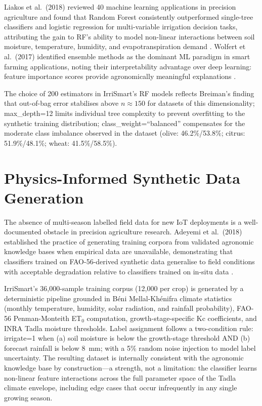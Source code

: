 \documentclass[12pt,a4paper]{report}
\begin{document}
Liakos et al.\ (2018) reviewed 40 machine learning applications in precision agriculture and found that Random Forest consistently outperformed single-tree classifiers and logistic regression for multi-variable irrigation decision tasks, attributing the gain to RF's ability to model non-linear interactions between soil moisture, temperature, humidity, and evapotranspiration demand \cite{liakos2018}. Wolfert et al.\ (2017) identified ensemble methods as the dominant ML paradigm in smart farming applications, noting their interpretability advantage over deep learning: feature importance scores provide agronomically meaningful explanations \cite{wolfert2017}.

The choice of 200 estimators in IrriSmart's RF models reflects Breiman's finding that out-of-bag error stabilises above $n \approx 150$ for datasets of this dimensionality; max\_depth=12 limits individual tree complexity to prevent overfitting to the synthetic training distribution; class\_weight=``balanced'' compensates for the moderate class imbalance observed in the dataset (olive: 46.2\%/53.8\%; citrus: 51.9\%/48.1\%; wheat: 41.5\%/58.5\%).

\section{Physics-Informed Synthetic Data Generation}

The absence of multi-season labelled field data for new IoT deployments is a well-documented obstacle in precision agriculture research. Adeyemi et al.\ (2018) established the practice of generating training corpora from validated agronomic knowledge bases when empirical data are unavailable, demonstrating that classifiers trained on FAO-56-derived synthetic data generalise to field conditions with acceptable degradation relative to classifiers trained on in-situ data \cite{adeyemi2018}.

IrriSmart's 36,000-sample training corpus (12,000 per crop) is generated by a deterministic pipeline grounded in Béni Mellal-Khénifra climate statistics (monthly temperature, humidity, solar radiation, and rainfall probability), FAO-56 Penman-Monteith ET$_0$ computation, growth-stage-specific Kc coefficients, and INRA Tadla moisture thresholds. Label assignment follows a two-condition rule: irrigate=1 when (a) soil moisture is below the growth-stage threshold AND (b) forecast rainfall is below 8~mm; with a 5\% random noise injection to model label uncertainty. The resulting dataset is internally consistent with the agronomic knowledge base by construction---a strength, not a limitation: the classifier learns non-linear feature interactions across the full parameter space of the Tadla climate envelope, including edge cases that occur infrequently in any single growing season.
\end{document}
